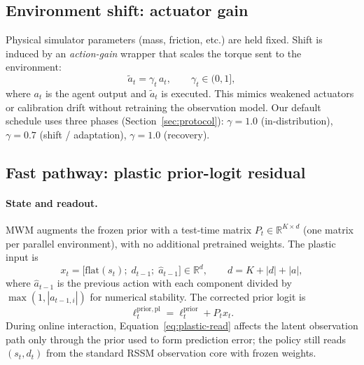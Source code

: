 \subsection{Environment shift: actuator gain}
\label{sec:shift}

Physical simulator parameters (mass, friction, etc.) are held fixed.
Shift is induced by an \emph{action-gain} wrapper that scales the torque sent to the environment:
\begin{equation}
  \tilde{a}_t = \gamma_t \, a_t, \qquad \gamma_t \in (0, 1],
\end{equation}
where $a_t$ is the agent output and $\tilde{a}_t$ is executed.
This mimics weakened actuators or calibration drift without retraining the observation model.
Our default schedule uses three phases (Section~\ref{sec:protocol}): $\gamma=1.0$ (in-distribution), $\gamma=0.7$ (shift / adaptation), $\gamma=1.0$ (recovery).

\subsection{Fast pathway: plastic prior-logit residual}
\label{sec:fast-plastic}

\paragraph{State and readout.}
MWM augments the frozen prior with a test-time matrix $P_t \in \mathbb{R}^{K \times d}$ (one matrix per parallel environment), with no additional pretrained weights.
The plastic input is
\begin{equation}
  x_t = \big[\mathrm{flat}(s_t);\; d_{t-1};\; \hat{a}_{t-1}\big] \in \mathbb{R}^{d},
  \qquad
  d = K + |d| + |a|,
\end{equation}
where $\hat{a}_{t-1}$ is the previous action with each component divided by $\max(1, |a_{t-1,i}|)$ for numerical stability.
The corrected prior logit is
\begin{equation}
  \ell^{\mathrm{prior,pl}}_t = \ell^{\mathrm{prior}}_t + P_t x_t.
  \label{eq:plastic-read}
\end{equation}
During online interaction, Equation~\eqref{eq:plastic-read} affects the latent observation path only through the prior used to form prediction error; the policy still reads $(s_t, d_t)$ from the standard RSSM observation core with frozen weights.

